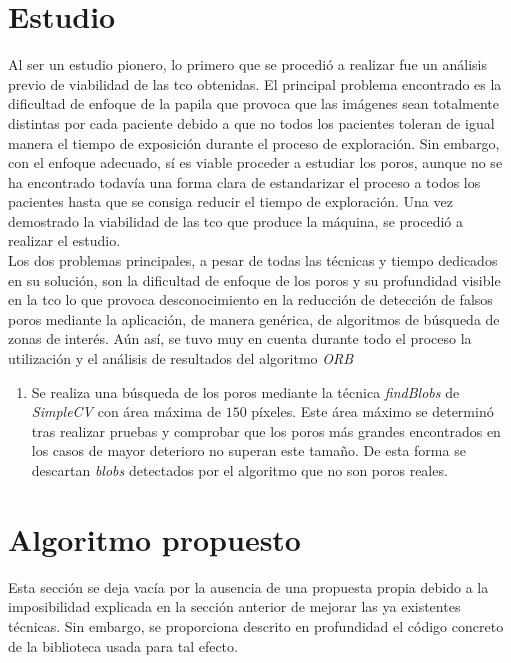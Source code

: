 \section{Estudio}
Al ser un estudio pionero, lo primero que se procedió a realizar fue
un análisis previo de viabilidad de las \gls{tco} obtenidas. El
principal problema encontrado es la dificultad de enfoque de la papila
que provoca que las imágenes sean totalmente distintas por cada
paciente debido a que no todos los pacientes toleran de igual manera
el tiempo de exposición durante el proceso de exploración. Sin
embargo, con el enfoque adecuado, sí es viable proceder a estudiar los
poros, aunque no se ha encontrado todavía una forma clara de
estandarizar el proceso a todos los pacientes hasta que se consiga
reducir el tiempo de exploración. Una vez demostrado la viabilidad de
las \gls{tco} que produce la máquina, se procedió a
realizar el estudio.\\
Los dos problemas principales, a pesar de todas las técnicas y tiempo
dedicados en su solución, son la dificultad de enfoque de los poros y
su profundidad visible en la \gls{tco} lo que provoca desconocimiento
en la reducción de detección de falsos poros mediante la aplicación,
de manera genérica, de algoritmos de búsqueda de zonas de
interés. Aún así, se tuvo muy en cuenta
durante todo el proceso la utilización y el análisis de resultados del
algoritmo \emph{\gls{ORB}~\citep*{orb-bib}}
\begin{enumerate}
\item Se realiza una búsqueda de los poros mediante la técnica
  \emph{findBlobs} de \emph{SimpleCV} con área máxima de $150$
  píxeles. Este área máximo se determinó tras realizar pruebas
  y comprobar que los poros más grandes encontrados en los casos
  de mayor deterioro no superan este tamaño. De esta forma se
  descartan \emph{blobs} detectados por el algoritmo que no son 
  poros reales.
\end{enumerate}

\section{Algoritmo propuesto}
Esta sección se deja vacía por la ausencia de una propuesta propia
debido a la imposibilidad explicada en la sección anterior de mejorar
las ya existentes técnicas. Sin embargo, se proporciona descrito en
profundidad el código concreto de la biblioteca usada para tal efecto.

